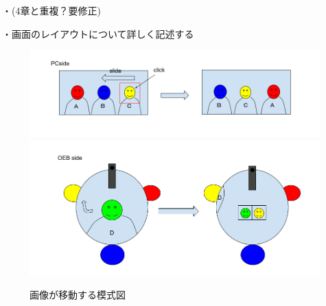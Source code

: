 ・(4章と重複？要修正)

・画面のレイアウトについて詳しく記述する

\begin{figure}[tp]
  \centering
  \includegraphics[scale=0.7]{fig/OEBimgSlide.png}
  \includegraphics[scale=0.7]{fig/PCimgSlide.png}
  \caption{画像が移動する模式図}
\end{figure}
